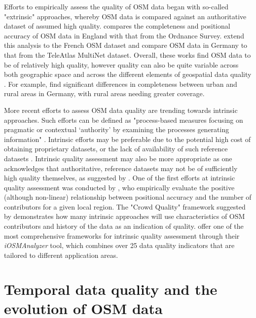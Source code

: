 Efforts to empirically assess the quality of OSM data began with so-called "extrinsic" approaches, whereby OSM data is compared against an authoritative dataset of assumed high quality. \textcite{haklay_how_2010} compares the completeness and positional accuracy of OSM data in England with that from the Ordnance Survey. \textcite{girres_quality_2010} extend this analysis to the French OSM dataset and \textcite{zielstra_comparative_2010} compare OSM data in Germany to that from the TeleAtlas MultiNet dataset. Overall, these works find OSM data to be of relatively high quality, however quality can also be quite variable across both geographic space and across the different elements of geospatial data quality \parencite{girres_quality_2010, haklay_how_2010}. For example, \textcite{zielstra_comparative_2010} find significant differences in completeness between urban and rural areas in Germany, with rural areas needing greater coverage.

More recent efforts to assess OSM data quality are trending towards intrinsic approaches. Such efforts can be defined as "process-based measures focusing on pragmatic or contextual ‘authority’ by examining the processes generating information" \parencite[p. 297]{anderson_crowd_2018}. Intrinsic efforts may be preferable due to the potential high cost of obtaining proprietary datasets, or the lack of availability of such reference datasets \parencite{estes_maps_1994}. Intrinsic quality assessment may also be more appropriate as one acknowledges that authoritative, reference datasets may not be of sufficiently high quality themselves, as suggested by \textcite[p. 112]{goodchild_assuring_2012}. One of the first efforts at intrinsic quality assessment was conducted by \textcite{haklay_how_2010-1}, who empirically evaluate the positive (although non-linear) relationship between positional accuracy and the number of contributors for a given local region. The "Crowd Quality" framework suggested by \textcite{van_exel_impact_2010} demonstrates how many intrinsic approaches will use characteristics of OSM contributors and history of the data as an indication of quality. \textcite{barron_comprehensive_2014} offer one of the most comprehensive frameworks for intrinsic quality assessment through their \textit{iOSMAnalyzer} tool, which combines over 25 data quality indicators that are tailored to different application areas. 

\section{Temporal data quality and the evolution of OSM data}

